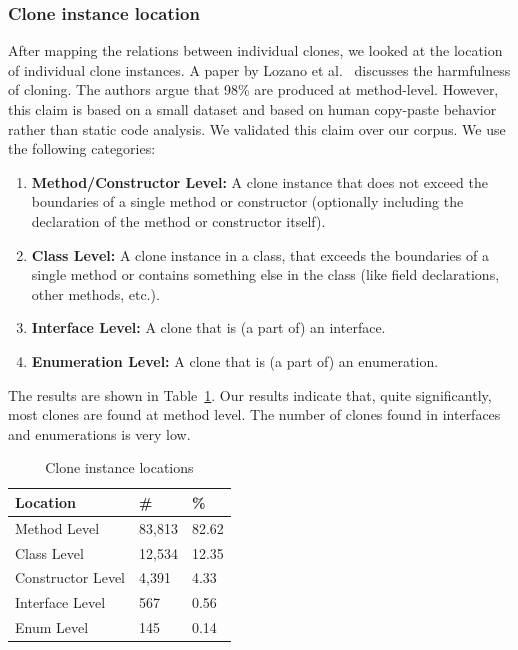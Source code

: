 \documentclass[a4paper]{article}
\begin{document}
\subsubsection{Clone instance location}\label{chap:clonelocation}
After mapping the relations between individual clones, we looked at the location of individual clone instances. A paper by Lozano et al.~\cite{lozano2007evaluating} discusses the harmfulness of cloning. The authors argue that 98\% are produced at method-level. However, this claim is based on a small dataset and based on human copy-paste behavior rather than static code analysis. We validated this claim over our corpus. We use the following categories:
\begin{enumerate}
  \item \textbf{Method/Constructor Level:} A clone instance that does not exceed the boundaries of a single method or constructor (optionally including the declaration of the method or constructor itself).
  \item \textbf{Class Level:} A clone instance in a class, that exceeds the boundaries of a single method or contains something else in the class (like field declarations, other methods, etc.).
  \item \textbf{Interface Level:} A clone that is (a part of) an interface.
  \item \textbf{Enumeration Level:} A clone that is (a part of) an enumeration.
\end{enumerate}

The results are shown in Table~\ref{table:locations}. Our results indicate that, quite significantly, most clones are found at method level. The number of clones found in interfaces and enumerations is very low.

\begin{table}[H]
  \begin{center}
  \caption{Clone instance locations} \label{table:locations}
  \medskip
\begin{tabular}{|l|l|l|}
\hline
\textbf{Location}   & \textbf{\#} & \textbf{\%} \\ \hline
Method Level        & 83,813 & 82.62            \\ \hline
Class Level        & 12,534 & 12.35            \\ \hline
Constructor Level    & 4,391 & 4.33           \\ \hline
Interface Level   & 567 & 0.56           \\ \hline
Enum Level         & 145 & 0.14            \\ \hline
\end{tabular}
\end{center}
\end{table}
\end{document}
